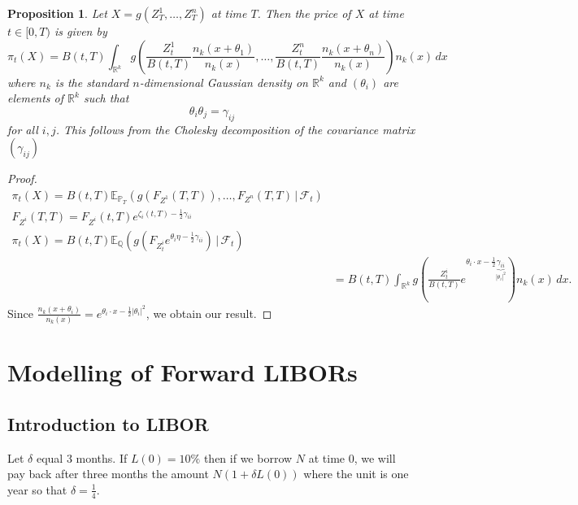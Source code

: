 \documentclass[10pt, oneside, reqno]{amsbook}
\theoremstyle{plain}%
\newtheorem{prop}[thm]{Proposition}
\theoremstyle{definition}
\theoremstyle{remark}
\newcommand{\given}{ \, | \,}
\newcommand{\sigf}{\mathcal{F}}
\newcommand{\Q}{\mathbb{Q}}
\newcommand{\R}{\mathbb{R}}
\newcommand{\E}{\mathbb{E}}
\renewcommand{\P}{\mathbb{P}}
\numberwithin{equation}{chapter}
\begin{document}
\begin{prop}
    Let $X = g(Z^1_T, \dots, Z^n_T)$ at time $T$.  Then the price of $X$ at time $t \in [0, T)$ is given by \[
        \pi_t(X) = B(t, T) \int_{\R^k} g\left( \frac{Z^1_t}{B(t, T)} \frac{n_k(x+ \theta_1)}{n_k(x)}, \dots, \frac{Z^n_t}{B(t, T)} \frac{n_k(x+\theta_n)}{n_k(x)}\right) n_k(x) \, dx
    \] where $n_k$ is the standard $n$-dimensional Gaussian density on $\R^k$ and $(\theta_i)$ are elements of $\R^k$ such that \[
        \theta_i \theta_j = \gamma_{ij}
    \] for all $i, j$.   This follows from the Cholesky decomposition of the covariance matrix $(\gamma_{ij})$
\end{prop}

\begin{proof}
    \begin{align*}
        \pi_t(X) = B(t, T) \E_{\P_T} \left( g(F_{Z^1}(T, T)), \dots, F_{Z^n}(T, T) \given \sigf_t \right) \\
        F_{Z^i}(T, T) = F_{Z^i}(t, T) e^{\zeta_i(t, T) - \frac{1}{2} \gamma_{ii}} \\
        \pi_t(X) = B(t, T) \E_\Q \left( g\left( F_{Z_t^i} e^{\theta_i \eta - \frac{1}{2} \gamma_{ii}} \right) \given \sigf_t \right) \\
        &= B(t, T) \int_{\R^k} g\left( \frac{Z^i_t}{B(t, T)} e^{\theta_i \cdot x - \frac{1}{2} \underbrace{\gamma_{ii}}_{|\theta_i|^2}} \right) n_k(x) \, dx.
    \end{align*}  Since $\frac{n_k(x + \theta_i)}{n_k(x)} = e^{\theta_i \cdot x - \frac{1}{2}|\theta_i|^2}$, we obtain our result.
\end{proof}

\chapter{Modelling of Forward LIBORs} %
\label{cha:modelling_of_forward_libors}
\section{Introduction to LIBOR} %
\label{sec:introduction}
Let $\delta$ equal 3 months.  If $L(0) = 10\%$ then if we borrow $N$ at time $0$, we will pay back after three months the amount $N(1 + \delta L(0))$ where the unit is one year so that $\delta = \frac{1}{4}$.
\end{document}

